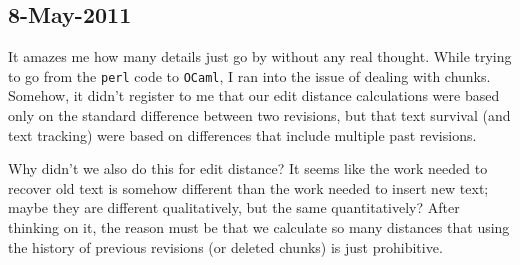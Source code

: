 \subsection{8-May-2011}

It amazes me how many details just go by without any real thought.
While trying to go from the \texttt{perl} code to \texttt{OCaml},
I ran into the issue of dealing with chunks.
Somehow, it didn't register to me that our edit distance calculations
were based only on the standard difference between two revisions,
but that text survival (and text tracking) were based on differences
that include multiple past revisions.

Why didn't we also do this for edit distance?
It seems like the work needed to recover old text
is somehow different than the work needed to insert new text;
maybe they are different qualitatively, but the same quantitatively?
After thinking on it, the reason must be that we calculate so many distances
that using the history of previous revisions (or deleted chunks) is
just prohibitive.

